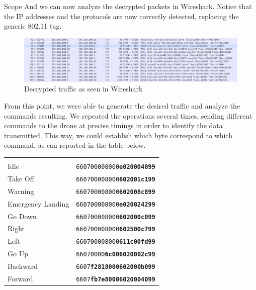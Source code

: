 \begin{chaptercover}{Scope}
And we can now analyze the decrypted packets in Wireshark. Notice that the IP addresses and the protocols are now correctly detected, replacing the generic 802.11 tag.

\begin{figure}[H]
  \centering
  \includegraphics[width=\linewidth]{figures/traffic-analysis-decrypted-packets}
  \caption{Decrypted traffic as seen in Wireshark}
  \label{fig:traffic-analysis-decrypted-packets}
\end{figure}

From this point, we were able to generate the desired traffic and analyze the commands resulting. We repeated the operations several times, sending different commands to the drone at precise timings in order to identify the data transmitted. This way, we could establish which byte correspond to which command, as can reported in the table below.

\begingroup
\renewcommand*{\arraystretch}{1.3}
\begin{center}
  \begin{tabular}{L{6cm}L{8cm}}
   &  \\
  Idle &              \texttt{660700008000\textbf{e020004099}} \\
  Take Off &          \texttt{660700008000\textbf{602001c199}} \\
  Warning &           \texttt{660700008000\textbf{602008c899}} \\
  Emergency Landing & \texttt{660700008000\textbf{e020024299}} \\
  Go Down &           \texttt{660700008000\textbf{602000c099}} \\
  Right &             \texttt{660700008000\textbf{602500c799}} \\
  Left &              \texttt{660700008000\textbf{611c00fd99}} \\
  Go Up &             \texttt{66070000\textbf{6c006020002c99}} \\
  Backward &          \texttt{6607\textbf{f2818000602000b099}} \\
  Forward &           \texttt{6607\textbf{fb7e80006020004099}} \\
\end{tabular}
\end{center}
\endgroup


\end{chaptercover}
